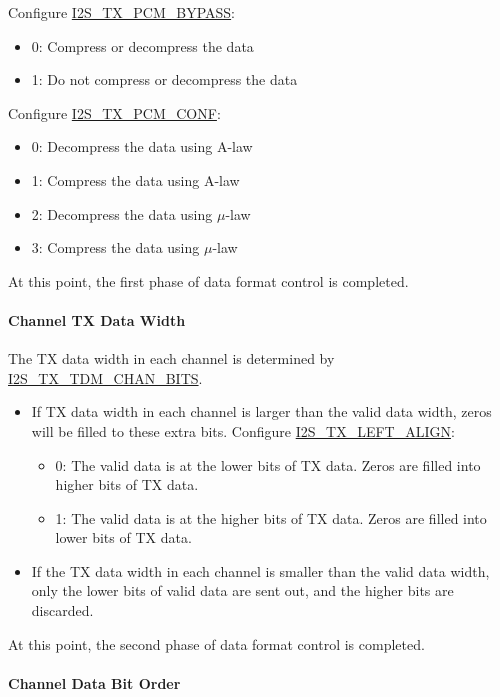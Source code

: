 \documentclass[main\_\_EN.tex]{subfiles}
\begin{document}
Configure \hyperref[fielddesc:I2STXPCMBYPASS]{I2S\_TX\_PCM\_BYPASS}:
\begin{itemize}
\item 0: Compress or decompress the data
\item 1: Do not compress or decompress the data
\end{itemize}
Configure \hyperref[fielddesc:I2STXPCMCONF]{I2S\_TX\_PCM\_CONF}: 
\begin{itemize}
\item 0: Decompress the data using A-law
\item 1: Compress the data using A-law
\item 2: Decompress the data using $\mu$-law
\item 3: Compress the data using $\mu$-law
\end{itemize}

At this point, the first phase of data format control is completed.

\paragraph{Channel TX Data Width}
\label{sec:i2s-tdm-chan-bits}

The TX data width in each channel is determined by \hyperref[fielddesc:I2STXTDMCHANBITS]{I2S\_TX\_TDM\_CHAN\_BITS}.

\begin{itemize}
\item If TX data width in each channel is larger than the valid data width, zeros will be filled to these extra bits. Configure  \hyperref[fielddesc:I2STXLEFTALIGN]{I2S\_TX\_LEFT\_ALIGN}:
\begin{itemize}
\item 0: The valid data is at the lower bits of TX data. Zeros are filled into higher bits of TX data.
\item 1: The valid data is at the higher bits of TX data. Zeros are filled into lower bits of TX data.
\end{itemize}
\item If the TX data width in each channel is smaller than the valid data width, only the lower bits of valid data are sent out, and the higher bits are discarded.
\end{itemize}

At this point, the second phase of data format control is completed.

\paragraph{Channel Data Bit Order}
\end{document}
